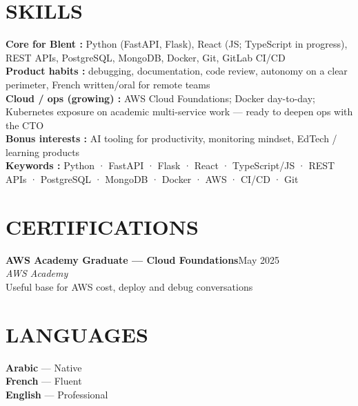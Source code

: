 \documentclass[10pt,a4paper]{article}
\newcommand{\TargetKeywords}{Python · FastAPI · Flask · React · TypeScript/JS · REST APIs · PostgreSQL · MongoDB · Docker · AWS · CI/CD · Git}
\newcommand{\cert}[4]{%
  \textbf{\color{primary}\small #1}\hfill{\color{muted}\scriptsize #3}\\[-1pt]
  {\color{accent}\small\textit{#2}}\\[0pt]
  {\color{muted}\scriptsize #4}\\[4pt]
}
\begin{document}
\section{SKILLS}
{\small
\textbf{\color{primary}Core for Blent :} Python (FastAPI, Flask), React (JS; TypeScript in progress), REST APIs, PostgreSQL, MongoDB, Docker, Git, GitLab CI/CD\\[2pt]
\textbf{\color{primary}Product habits :} debugging, documentation, code review, autonomy on a clear perimeter, French written/oral for remote teams\\[2pt]
\textbf{\color{primary}Cloud / ops (growing) :} AWS Cloud Foundations; Docker day-to-day; Kubernetes exposure on academic multi-service work --- ready to deepen ops with the CTO\\[2pt]
\textbf{\color{primary}Bonus interests :} AI tooling for productivity, monitoring mindset, EdTech / learning products\\[2pt]
\textbf{\color{primary}Keywords :} \TargetKeywords
}

\vspace{2pt}
\begin{minipage}[t]{0.65\textwidth}
\section{CERTIFICATIONS}
\cert{AWS Academy Graduate --- Cloud Foundations}{AWS Academy}{May 2025}{Useful base for AWS cost, deploy and debug conversations}
\end{minipage}%
\hfill
\begin{minipage}[t]{0.32\textwidth}
\section{LANGUAGES}
{\small\textbf{Arabic} --- Native}\\[2pt]
{\small\textbf{French} --- Fluent}\\[2pt]
{\small\textbf{English} --- Professional}
\end{minipage}
\end{document}
